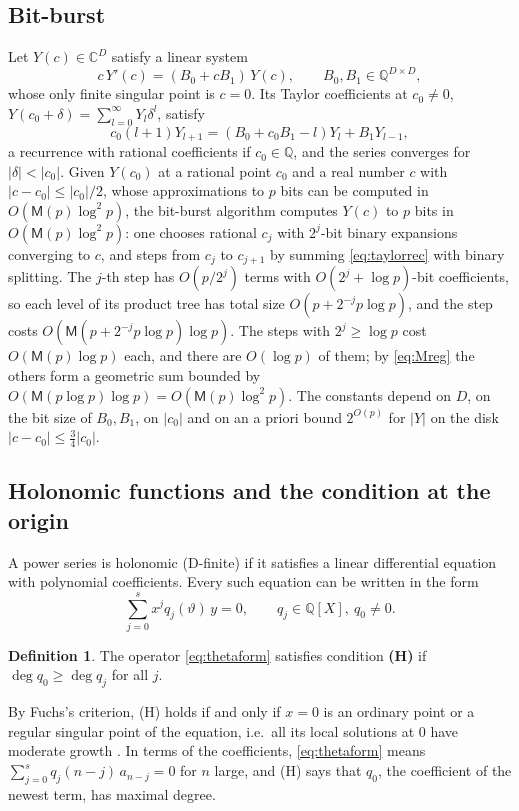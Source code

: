 \documentclass[11pt,reqno]{amsart}
\theoremstyle{definition}
\newtheorem{definition}[theorem]{Definition}
\theoremstyle{remark}
\newcommand{\QQ}{\mathbb{Q}}
\newcommand{\CC}{\mathbb{C}}
\newcommand{\Mul}{\mathsf{M}}
\begin{document}
\subsection{Bit-burst}\label{sec:bitburst} Let $Y(c) \in \CC^D$ satisfy a linear system
\begin{equation}\label{eq:fuchsys}
  c\, Y'(c) = (B_0 + c B_1)\, Y(c), \qquad B_0, B_1 \in \QQ^{D \times D},
\end{equation}
whose only finite singular point is $c = 0$. Its Taylor coefficients at $c_0 \ne 0$,
$Y(c_0 + \delta) = \sum_{l=0}^{\infty} Y_l \delta^l$, satisfy
\begin{equation}\label{eq:taylorrec}
  c_0 (l+1) Y_{l+1} = (B_0 + c_0 B_1 - l) Y_l + B_1 Y_{l-1},
\end{equation}
a recurrence with rational coefficients if $c_0 \in \QQ$, and the series converges for $|\delta| < |c_0|$.
Given $Y(c_0)$ at a rational point $c_0$ and a real number $c$ with $|c - c_0| \le |c_0|/2$, whose
approximations to $p$ bits can be computed in $O(\Mul(p)\log^2 p)$, the bit-burst algorithm
\cite{CC90,vdH99} computes $Y(c)$ to $p$ bits in $O(\Mul(p)\log^2 p)$: one chooses rational
$c_j$ with $2^j$-bit binary expansions converging to $c$, and steps from $c_{j}$ to $c_{j+1}$ by
summing \eqref{eq:taylorrec} with binary splitting. The $j$-th step has $O(p/2^j)$ terms with
$O(2^j + \log p)$-bit coefficients, so each level of its product tree has total size $O(p + 2^{-j}p\log p)$,
and the step costs $O(\Mul(p + 2^{-j}p\log p)\log p)$. The steps with $2^j \ge \log p$ cost $O(\Mul(p)\log p)$
each, and there are $O(\log p)$ of them; by \eqref{eq:Mreg} the others form a geometric sum bounded by
$O(\Mul(p\log p)\log p) = O(\Mul(p)\log^2 p)$.
The constants depend on $D$, on the bit size of $B_0, B_1$, on $|c_0|$ and on an a priori bound
$2^{O(p)}$ for $|Y|$ on the disk $|c - c_0| \le \frac34 |c_0|$.

\subsection{Holonomic functions and the condition at the origin}
A power series is holonomic (D-finite) if it satisfies a linear differential equation with polynomial coefficients.
Every such equation can be written in the form
\begin{equation}\label{eq:thetaform}
  \sum_{j=0}^{s} x^j q_j(\vartheta)\, y = 0, \qquad q_j \in \QQ[X],\ q_0 \ne 0 .
\end{equation}
\begin{definition}
The operator \eqref{eq:thetaform} satisfies condition \textbf{(H)} if $\deg q_0 \ge \deg q_j$ for all $j$.
\end{definition}
By Fuchs's criterion, (H) holds if and only if $x = 0$ is an ordinary point or a regular singular
point of the equation, i.e.\ all its local solutions at $0$ have moderate growth \cite[\S15.3]{Inc26}.
In terms of the coefficients, \eqref{eq:thetaform} means $\sum_{j=0}^{s} q_j(n-j)\, a_{n-j} = 0$ for $n$ large,
and (H) says that $q_0$, the coefficient of the newest term, has maximal degree.
\end{document}
